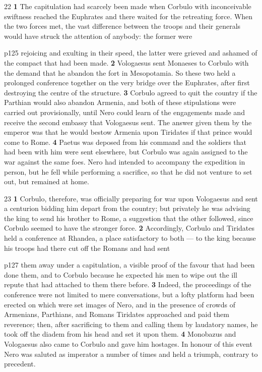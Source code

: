 22
\textbf{1} The capitulation had scarcely been made when Corbulo with inconceivable swiftness reached the Euphrates and there waited for the retreating force. When the two forces met, the vast difference between the troops and their generals would have struck the attention of anybody: the former were

p125 rejoi­cing and exulting in their speed, the latter were grieved and ashamed of the compact that had been made. \textbf{2} Vologaesus sent Monaeses to Corbulo with the demand that he abandon the fort in Mesopotamia. So these two held a prolonged conference together on the very bridge over the Euphrates, after first destroying the centre of the structure. \textbf{3} Corbulo agreed to quit the country if the Parthian would also abandon Armenia, and both of these stipulations were carried out provisionally, until Nero could learn of the engagements made and receive the second embassy that Vologaesus sent. The answer given them by the emperor was that he would bestow Armenia upon Tiridates if that prince would come to Rome. \textbf{4} Paetus was deposed from his command and the soldiers that had been with him were sent elsewhere, but Corbulo was again assigned to the war against the same foes. Nero had intended to accompany the expedition in person, but he fell while performing a sacrifice, so that he did not venture to set out, but remained at home.

23
\textbf{1} Corbulo, therefore, was officially preparing for war upon Vologaesus and sent a centurion bidding him depart from the country; but privately he was advising the king to send his brother to Rome, a suggestion that the other followed, since Corbulo seemed to have the stronger force. \textbf{2} Accordingly, Corbulo and Tiridates held a conference at Rhandea, a place satisfactory to both \texthebrew{—} to the king because his troops had there cut off the Romans and had sent

p127 them away under a capitulation, a visible proof of the favour that had been done them, and to Corbulo because he expected his men to wipe out the ill repute that had attached to them there before. \textbf{3} Indeed, the proceedings of the conference were not limited to mere conversations, but a lofty platform had been erected on which were set images of Nero, and in the presence of crowds of Armenians, Parthians, and Romans Tiridates approached and paid them reverence; then, after sacrifi­cing to them and calling them by laudatory names, he took off the diadem from his head and set it upon them. \textbf{4} Monobazus and Vologaesus also came to Corbulo and gave him hostages. In honour of this event Nero was saluted as imperator a number of times and held a triumph, contrary to precedent.

